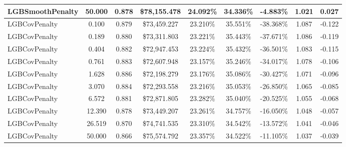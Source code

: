 \documentclass[12pt, draft]{article}
\theoremstyle{plain}
\theoremstyle{definition}
\newcommand{\1}{\mathbf{1}}
\begin{document}
{\begin{table}[!htbp]
{\begin{tabular}{lc|cc|cc|ccc}
LGBSmoothPenalty & 50.000 & 0.878 & \$78{,}155.478 & 24.092\% & 34.336\% & -4.883\% & 1.021 & 0.027 \\
\midrule
LGBCovPenalty & 0.100 & 0.879 & \$73{,}459.227 & 23.210\% & 35.551\% & -38.368\% & 1.087 & -0.122 \\
LGBCovPenalty & 0.189 & 0.880 & \$73{,}311.803 & 23.221\% & 35.443\% & -37.671\% & 1.086 & -0.119 \\
LGBCovPenalty & 0.404 & 0.882 & \$72{,}947.453 & 23.224\% & 35.432\% & -36.501\% & 1.083 & -0.115 \\
LGBCovPenalty & 0.761 & 0.883 & \$72{,}607.948 & 23.157\% & 35.246\% & -34.017\% & 1.078 & -0.106 \\
LGBCovPenalty & 1.628 & 0.886 & \$72{,}198.279 & 23.176\% & 35.086\% & -30.427\% & 1.071 & -0.096 \\
LGBCovPenalty & 3.070 & 0.884 & \$72{,}293.558 & 23.216\% & 35.053\% & -26.850\% & 1.065 & -0.085 \\
LGBCovPenalty & 6.572 & 0.881 & \$72{,}871.805 & 23.282\% & 35.040\% & -20.525\% & 1.055 & -0.068 \\
LGBCovPenalty & 12.390 & 0.878 & \$73{,}449.207 & 23.261\% & 34.757\% & -16.050\% & 1.048 & -0.057 \\
LGBCovPenalty & 26.519 & 0.870 & \$74{,}741.535 & 23.310\% & 34.542\% & -13.572\% & 1.041 & -0.046 \\
LGBCovPenalty & 50.000 & 0.866 & \$75{,}574.792 & 23.357\% & 34.522\% & -11.105\% & 1.037 & -0.039 \\
\bottomrule
\end{tabular}}
\end{table}

}
\end{document}
